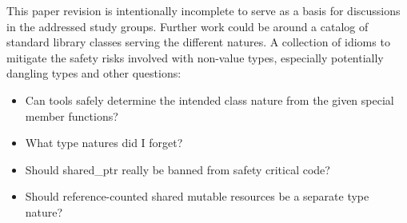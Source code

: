 \documentclass[ebook,11pt,article]{memoir}
\begin{document}
This paper revision is intentionally incomplete to serve as a basis for discussions in the addressed study groups. Further work could be around a catalog of standard library classes serving the different natures. A collection of idioms to mitigate the safety risks involved with non-value types, especially potentially dangling types and other questions:

\begin{itemize}
\item Can tools safely determine the intended class nature from the given special member functions?
\item What type natures did I forget? 
\item Should shared_ptr really be banned from safety critical code?
\item Should reference-counted shared mutable resources be a separate type nature?
\end{itemize}





\end{document}
